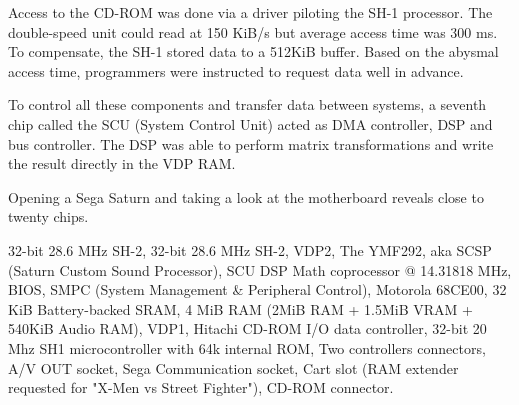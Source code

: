 \par
Access to the CD-ROM was done via a driver piloting the SH-1 processor. The double-speed unit could read at 150 KiB/s but average access time was 300 ms. To compensate, the SH-1 stored data to a 512KiB buffer. Based on the abysmal access time, programmers were instructed to request data well in advance.\\ 
\par
To control all these components and transfer data between systems, a seventh chip called the SCU (System Control Unit) acted as DMA controller, DSP and bus controller. The DSP was able to perform matrix transformations and write the result directly in the VDP RAM.\\
\par


\pagebreak





\par
Opening a Sega Saturn and taking a look at the motherboard reveals close to twenty chips.\\
\par
{} 32-bit 28.6 MHz SH-2, 
 32-bit 28.6 MHz SH-2, 
 VDP2, 
 The YMF292, aka SCSP (Saturn Custom Sound Processor), 
 SCU DSP Math coprocessor @ 14.31818 MHz, 
 BIOS, 
 SMPC (System Management \& Peripheral Control), 
 Motorola 68CE00, 
 32 KiB Battery-backed SRAM, 
 4 MiB RAM (2MiB RAM + 1.5MiB VRAM + 540KiB Audio RAM), 
 VDP1, 
 Hitachi CD-ROM I/O data controller, 
 32-bit 20 Mhz SH1  microcontroller with 64k internal ROM, 
 Two controllers connectors, 
 A/V OUT socket,  
 Sega Communication socket,  
 Cart slot (RAM extender requested for "X-Men vs Street Fighter"), 
 CD-ROM connector.






